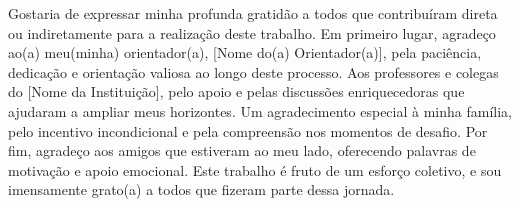 \begin{agradecimentos}
Gostaria de expressar minha profunda gratidão a todos que contribuíram direta ou indiretamente para a realização deste trabalho. Em primeiro lugar, agradeço ao(a) meu(minha) orientador(a), [Nome do(a) Orientador(a)], pela paciência, dedicação e orientação valiosa ao longo deste processo. Aos professores e colegas do [Nome da Instituição], pelo apoio e pelas discussões enriquecedoras que ajudaram a ampliar meus horizontes. Um agradecimento especial à minha família, pelo incentivo incondicional e pela compreensão nos momentos de desafio. Por fim, agradeço aos amigos que estiveram ao meu lado, oferecendo palavras de motivação e apoio emocional. Este trabalho é fruto de um esforço coletivo, e sou imensamente grato(a) a todos que fizeram parte dessa jornada.
\end{agradecimentos}
